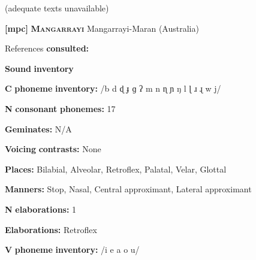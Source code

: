 \documentclass[output=paper]{langsci/langscibook}
\begin{document}
\begin{styleBody}
(adequate texts unavailable)
\end{styleBody}

\begin{styleBody}
\textbf{[mpc]}   \textbf{\textsc{Mangarrayi}  }  Mangarrayi-Maran (Australia)
\end{styleBody}

\begin{styleBody}
References \textbf{consulted:} \citet{Merlan1989}
\end{styleBody}

\begin{styleBody}
\textbf{Sound} \textbf{inventory}
\end{styleBody}

\begin{styleBody}
\textbf{C} \textbf{phoneme} \textbf{inventory:} /b d ɖ ɟ ɡ ʔ m n ɳ ɲ ŋ l ɭ ɹ ɻ w j/
\end{styleBody}

\begin{styleBody}
\textbf{N} \textbf{consonant} \textbf{phonemes:} 17
\end{styleBody}

\begin{styleBody}
\textbf{Geminates:} N/A
\end{styleBody}

\begin{styleBody}
\textbf{Voicing} \textbf{contrasts:} None
\end{styleBody}

\begin{styleBody}
\textbf{Places:} Bilabial, Alveolar, Retroflex, Palatal, Velar, Glottal
\end{styleBody}

\begin{styleBody}
\textbf{Manners:} Stop, Nasal, Central approximant, Lateral approximant
\end{styleBody}

\begin{styleBody}
\textbf{N} \textbf{elaborations:} 1
\end{styleBody}

\begin{styleBody}
\textbf{Elaborations:} Retroflex
\end{styleBody}

\begin{styleBody}
\textbf{V} \textbf{phoneme} \textbf{inventory:} /i e a o u/
\end{styleBody}
\end{document}
